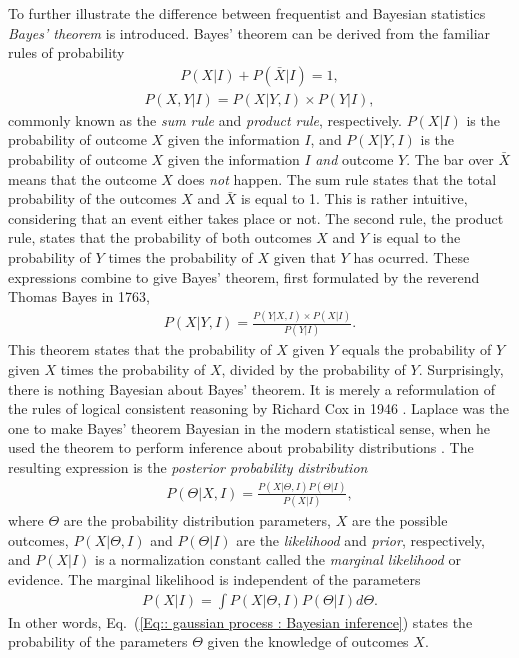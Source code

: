 \documentclass[twoside,english]{uiofysmaster}
\begin{document}
To further illustrate the difference between frequentist and Bayesian statistics \textit{Bayes' theorem} \cite{mr1763essay} is introduced. Bayes' theorem can be derived from the familiar rules of probability
\begin{align}\label{Eq:: gaussian process : Sum rule}
P(X | I) + P(\bar{X} | I) = 1,
\end{align}
\begin{align}\label{Eq:: gaussian process : Product rule}
P(X, Y | I) = P(X | Y, I) \times P(Y | I),
\end{align} 
commonly known as the \textit{sum rule} and \textit{product rule}, respectively. $P(X|I)$ is the probability of outcome $X$ given the information $I$, and $P(X|Y,I)$ is the probability of outcome $X$ given the information $I$ \textit{and} outcome $Y$. The bar over $\bar{X}$ means that the outcome $X$ does \textit{not} happen. The sum rule states that the total probability of the outcomes $X$ and $\bar{X}$ is equal to 1. This is rather intuitive, considering that an event either takes place or not. The second rule, the product rule, states that the probability of both outcomes $X$ and $Y$ is equal to the probability of $Y$ times the probability of $X$ given that $Y$ has ocurred. These expressions combine to give Bayes' theorem, first formulated by the reverend Thomas Bayes in 1763,
\begin{align}\label{Eq:: gaussian process : Bayes theorem}
P(X | Y, I) = \frac{P(Y | X, I) \times P(X | I)}{P(Y | I)}.
\end{align}
This theorem states that the probability of $X$ given $Y$ equals the probability of $Y$ given $X$ times the probability of $X$, divided by the probability of $Y$. Surprisingly, there is nothing Bayesian about Bayes' theorem. It is merely a reformulation of the rules of logical consistent reasoning by Richard Cox in 1946 \cite{sivia2006data}. Laplace was the one to make Bayes' theorem Bayesian in the modern statistical sense, when he used the theorem to perform inference about probability distributions \cite{laplace1820theorie}. The resulting expression is the \textit{posterior probability distribution}
\begin{align}\label{Eq:: gaussian process : Bayesian inference}
P(\Theta | X , I) = \frac{P(X|\Theta, I) P(\Theta| I)}{P(X | I)},
\end{align}
where $\Theta$ are the probability distribution parameters, $X$ are the possible outcomes, $P(X|\Theta, I)$  and $P(\Theta |I)$ are the \textit{likelihood} and \textit{prior}, respectively, and $P(X|I)$ is a normalization constant called the \textit{marginal likelihood} or evidence. The marginal likelihood is independent of the parameters
\begin{align}
P(X|I) = \int P(X| \Theta, I) P(\Theta | I) d \Theta.
\end{align}
In other words, Eq.~(\ref{Eq:: gaussian process : Bayesian inference}) states the probability of the parameters $\Theta$ given the knowledge of outcomes $X$.
\end{document}
